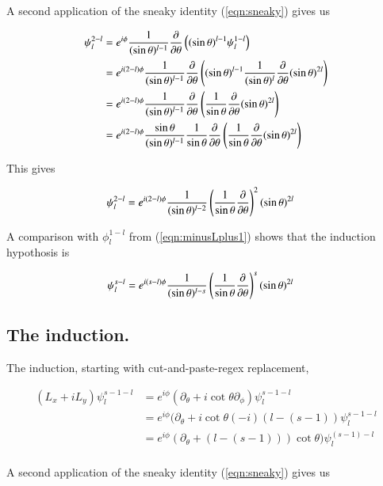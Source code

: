 A second application of the sneaky identity (\ref{eqn:sneaky}) gives us

\begin{align*}
\psi_l^{2-l} 
&=
e^{i\phi} \frac{1}{(\sin\theta)^{l-1}} \frac{\partial {}}{\partial {\theta}} \left( (\sin\theta)^{l-1} \psi_l^{1-l} \right) \\
&=
e^{i(2-l)\phi} \frac{1}{(\sin\theta)^{l-1}} \frac{\partial {}}{\partial {\theta}} \left( (\sin\theta)^{l-1} 
\frac{1}{(\sin\theta)^l} \frac{\partial {}}{\partial {\theta}} (\sin\theta)^{2l}
\right) \\
&=
e^{i(2-l)\phi} \frac{1}{(\sin\theta)^{l-1}} \frac{\partial {}}{\partial {\theta}} \left( 
\frac{1}{\sin\theta} \frac{\partial {}}{\partial {\theta}} (\sin\theta)^{2l}
\right) \\
&=
e^{i(2-l)\phi} \frac{\sin\theta}{(\sin\theta)^{l-1}} \frac{1}{\sin\theta}\frac{\partial {}}{\partial {\theta}} \left( 
\frac{1}{\sin\theta} \frac{\partial {}}{\partial {\theta}} (\sin\theta)^{2l}
\right) \\
\end{align*}

This gives

\begin{align}\label{eqn:2minusL}
\psi_l^{2-l} 
&=
e^{i(2-l)\phi} \frac{1}{(\sin\theta)^{l-2}} \left( \frac{1}{\sin\theta}\frac{\partial {}}{\partial {\theta}} \right)^2 (\sin\theta)^{2l} 
\end{align}

A comparison with $\phi_l^{1-l}$ from (\ref{eqn:minusLplus1}) shows that the induction hypothosis is

\begin{align}
\psi_l^{s-l} 
&=
e^{i(s-l)\phi} \frac{1}{(\sin\theta)^{l-s}} \left( \frac{1}{\sin\theta}\frac{\partial {}}{\partial {\theta}} \right)^s (\sin\theta)^{2l} 
\end{align}

\subsection{The induction.}

The induction, starting with cut-and-paste-regex replacement, 

\begin{align*}
(L_x + iL_y) \psi_l^{{s-1}-l} 
&=
e^{i\phi} (\partial_\theta + i \cot\theta \partial_\phi) \psi_l^{{s-1}-l} \\
&=
e^{i\phi} (\partial_\theta + i \cot\theta (-i)(l -(s-1)) \psi_l^{{s-1}-l} \\
&=
e^{i\phi} (\partial_\theta + (l -(s-1)))\cot\theta ) \psi_l^{(s-1)-l} \\
\end{align*}

A second application of the sneaky identity (\ref{eqn:sneaky}) gives us

